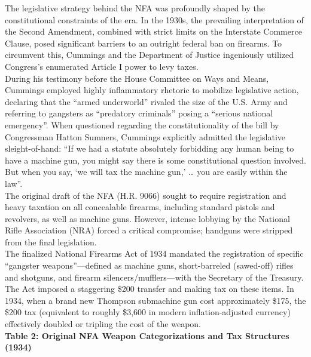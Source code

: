 \documentclass[
]{article}
\begin{document}
The legislative strategy behind the NFA was profoundly shaped by the
constitutional constraints of the era. In the 1930s, the prevailing
interpretation of the Second Amendment, combined with strict limits on
the Interstate Commerce Clause, posed significant barriers to an
outright federal ban on firearms. To circumvent this, Cummings and the
Department of Justice ingeniously utilized Congress's enumerated Article
I power to levy taxes.\\
During his testimony before the House Committee on Ways and Means,
Cummings employed highly inflammatory rhetoric to mobilize legislative
action, declaring that the ``armed underworld'' rivaled the size of the
U.S. Army and referring to gangsters as ``predatory criminals'' posing a
``serious national emergency''. When questioned regarding the
constitutionality of the bill by Congressman Hatton Sumners, Cummings
explicitly admitted the legislative sleight-of-hand: ``If we had a
statute absolutely forbidding any human being to have a machine gun, you
might say there is some constitutional question involved. But when you
say, `we will tax the machine gun,' \ldots{} you are easily within the
law''.\\
The original draft of the NFA (H.R. 9066) sought to require registration
and heavy taxation on all concealable firearms, including standard
pistols and revolvers, as well as machine guns. However, intense
lobbying by the National Rifle Association (NRA) forced a critical
compromise; handguns were stripped from the final legislation.\\
The finalized National Firearms Act of 1934 mandated the registration of
specific ``gangster weapons''---defined as machine guns, short-barreled
(sawed-off) rifles and shotguns, and firearm silencers/mufflers---with
the Secretary of the Treasury. The Act imposed a staggering \$200
transfer and making tax on these items. In 1934, when a brand new
Thompson submachine gun cost approximately \$175, the \$200 tax
(equivalent to roughly \$3,600 in modern inflation-adjusted currency)
effectively doubled or tripling the cost of the weapon.\\
\textbf{Table 2: Original NFA Weapon Categorizations and Tax Structures
(1934)}
\end{document}
